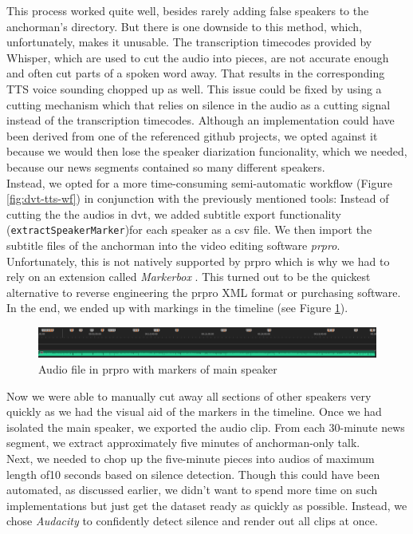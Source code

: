 \documentclass[
  a4paper,  %
  twoside,  %
  bibliography=totoc,
  headsepline,
  cleardoublepage=empty,
  parskip=half,
  draft=false
]{scrbook}
\begin{document}
This process worked quite well, besides rarely adding false speakers to the anchorman's directory. But there is one downside to this method, which, unfortunately, makes it unusable. The transcription timecodes provided by Whisper, which are used to cut the audio into pieces, are not accurate enough and often cut parts of a spoken word away. That results in the corresponding TTS voice sounding chopped up as well. This issue could be fixed by using a cutting mechanism which that relies on silence in the audio as a cutting signal instead of the transcription timecodes. Although an implementation could have been derived from one of the referenced github projects, we opted against it because we would then lose the speaker diarization funcionality, which we needed, because our news segments contained so many different speakers. \\
Instead, we opted for a more time-consuming semi-automatic workflow (Figure \ref{fig:dvt-tts-wf}) in conjunction with the previously mentioned tools: Instead of cutting the the audios in \gls{dvt}, we added subtitle export functionality (\verb|extractSpeakerMarker|)for each speaker as a csv file. We then import the subtitle files of the anchorman into the video editing software \textit{\gls{prpro}}. Unfortunately, this is not natively supported by \gls{prpro} which is why we had to rely on an extension called \textit{Markerbox} \cite{montgomeryMARKERBOXFreeMarker}. This turned out to be the quickest alternative to reverse engineering the \gls{prpro} XML format or purchasing software. In the end, we ended up with markings in the timeline (see Figure \ref{fig:premier-markers}). 
\begin{figure}[h]
  \centering
  \includegraphics[width=1\textwidth]{./graphics/images/tts/premier with markers.png}
  \caption{Audio file in \gls{prpro} with markers of main speaker}
  \label{fig:premier-markers}
\end{figure}
Now we were able to manually cut away all sections of other speakers very quickly as we had the visual aid of the markers in the timeline. Once we had isolated the main speaker, we exported the audio clip. From each 30-minute news segment, we extract approximately five minutes of anchorman-only talk.\\
Next, we needed to chop up the five-minute pieces into audios of  maximum length of10 seconds based on silence detection. Though this could have been automated, as discussed earlier, we didn't want to spend more time on such implementations but just get the dataset ready as quickly as possible. Instead, we chose \textit{Audacity} to confidently detect silence and render out all clips at once. \\
\end{document}
